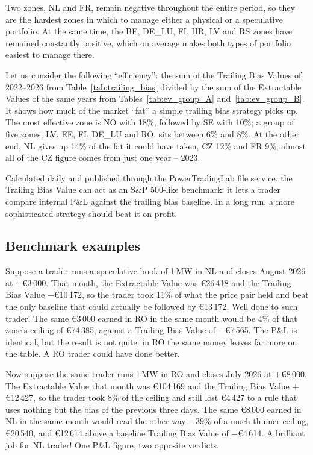\documentclass[11pt,a4paper]{article}
\begin{document}
Two zones, NL and FR, remain negative throughout the entire period, so they are the hardest zones in which to manage either a physical or a speculative portfolio. At the same time, the BE, DE\_LU, FI, HR, LV and RS zones have remained constantly positive, which on average makes both types of portfolio easiest to manage there.

Let us consider the following ``efficiency'': the sum of the Trailing Bias Values of 2022--2026 from Table~\ref{tab:trailing_bias} divided by the sum of the Extractable Values of the same years from Tables~\ref{tab:ev_group_A} and~\ref{tab:ev_group_B}. It shows how much of the market ``fat'' a simple trailing bias strategy picks up. The most effective zone is NO with 18\%, followed by SE with 10\%; a group of five zones, LV, EE, FI, DE\_LU and RO, sits between 6\% and 8\%. At the other end, NL gives up 14\% of the fat it could have taken, CZ 12\% and FR 9\%; almost all of the CZ figure comes from just one year -- 2023.

Calculated daily and published through the PowerTradingLab file service, the Trailing Bias Value can act as an S\&P 500-like benchmark: it lets a trader compare internal P\&L against the trailing bias baseline. In a long run, a more sophisticated strategy should beat it on profit.

\subsection{Benchmark examples}

Suppose a trader runs a speculative book of 1\,MW in NL and closes August 2026 at $+$\euro3\,000. That month, the Extractable Value was \euro26\,418 and the
Trailing Bias Value $-$\euro10\,172, so the trader took 11\% of what the price pair held and beat the only baseline that could actually be followed by \euro13\,172. Well done to such trader! The same \euro3\,000 earned in RO in the same month would be 4\% of that zone's ceiling of \euro74\,385, against a Trailing Bias Value of $-$\euro7\,565. The P\&L is identical, but the result is not quite: in RO the same money leaves far more on the table. A RO trader could have done better.

Now suppose the same trader runs 1\,MW in RO and closes July 2026 at $+$\euro8\,000. The Extractable Value that month was \euro104\,169 and the Trailing Bias Value $+$\euro12\,427, so the trader took 8\% of the ceiling and still lost \euro4\,427 to a rule that uses nothing but the bias of the previous three days. The same \euro8\,000 earned in NL in the same month would read the other way -- 39\% of a much thinner ceiling, \euro20\,540, and \euro12\,614 above a baseline Trailing Bias Value of $-$\euro4\,614. A brilliant job for NL trader! One P\&L figure, two opposite verdicts. 
\end{document}
